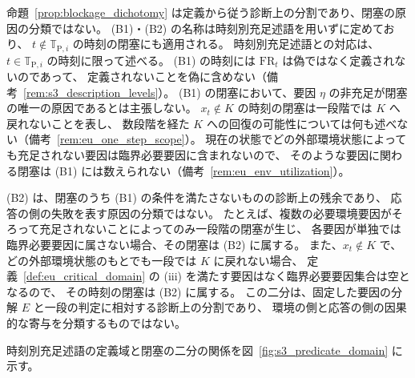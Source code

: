 \begin{remark}[二分の地位]
\label{rem:blockage_dichotomy}
命題~\ref{prop:blockage_dichotomy} は定義から従う診断上の分割であり、閉塞の原因の分類ではない。
(B1)・(B2) の名称は時刻別充足述語を用いずに定めており、
$t\notin\mathbb{T}_{\mathrm{P},i}$ の時刻の閉塞にも適用される。
時刻別充足述語との対応は、$t\in\mathbb{T}_{\mathrm{P},i}$ の時刻に限って述べる。
(B1) の時刻には $\mathrm{FR}_t$ は偽ではなく定義されないのであって、
定義されないことを偽に含めない（備考~\ref{rem:s3_description_levels}）。
(B1) の閉塞において、要因 $\eta$ の非充足が閉塞の唯一の原因であるとは主張しない。
$x_t\notin K$ の時刻の閉塞は一段階では $K$ へ戻れないことを表し、
数段階を経た $K$ への回復の可能性については何も述べない（備考~\ref{rem:eu_one_step_scope}）。
現在の状態でどの外部環境状態によっても充足されない要因は臨界必要要因に含まれないので、
そのような要因に関わる閉塞は (B1) には数えられない（備考~\ref{rem:eu_env_utilization}）。

(B2) は、閉塞のうち (B1) の条件を満たさないものの診断上の残余であり、
応答の側の失敗を表す原因の分類ではない。
たとえば、複数の必要環境要因がそろって充足されないことによってのみ一段階の閉塞が生じ、
各要因が単独では臨界必要要因に属さない場合、その閉塞は (B2) に属する。
また、$x_t\notin K$ で、どの外部環境状態のもとでも一段では $K$ に戻れない場合、
定義~\ref{def:eu_critical_domain} の (iii) を満たす要因はなく臨界必要要因集合は空となるので、
その時刻の閉塞は (B2) に属する。
この二分は、固定した要因の分解 $E$ と一段の判定に相対する診断上の分割であり、
環境の側と応答の側の因果的な寄与を分類するものではない。
\end{remark}

時刻別充足述語の定義域と閉塞の二分の関係を図~\ref{fig:s3_predicate_domain} に示す。

